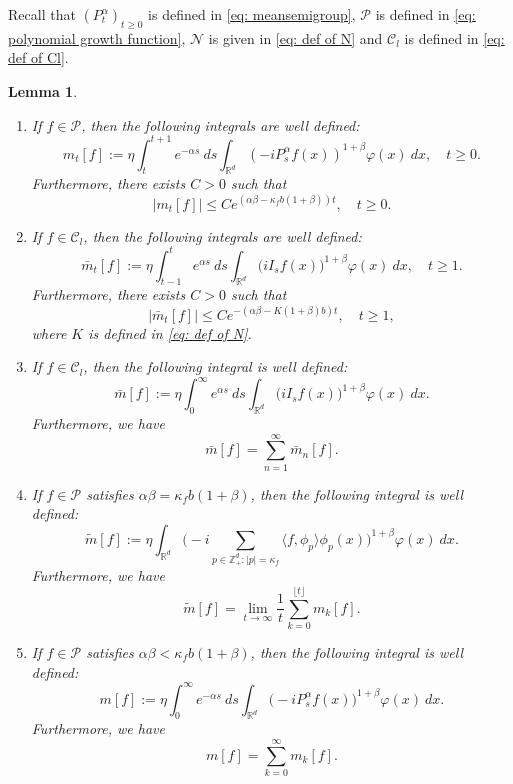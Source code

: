 \documentclass[12pt,a4paper]{amsart}
\theoremstyle{plain}
\newtheorem{lem}[thm]{Lemma}
\theoremstyle{definition}
\numberwithin{equation}{section}
\begin{document}
Recall that $(P^\alpha_t)_{t\geq 0}$ is defined in \eqref{eq: meansemigroup}, $\mathcal P$ is defined in \eqref{eq: polynomial growth function}, $\mathcal N$ is given in \eqref{eq: def of N} and $\mathcal C_l$ is defined in \eqref{eq: def of Cl}.
\begin{lem}
\label{lem: def of all m}
\begin{enumerate}
\item
  If $f\in\mathcal{P}$, then the following integrals are well defined:
  \[
    m_t[f]
    := \eta \int_t^{t+1}e^{-\alpha s}~ds\int_{\mathbb R^d} (-iP_{s}^\alpha f(x))^{1+\beta} \varphi(x)~dx,
    \quad t\geq 0.
  \]
	Furthermore, there exists  $C>0$ such that
  \begin{equation}
    \label{domi-m}
    |m_t[f]|
    \leq C e^{(\alpha\beta-\kappa_fb(1+\beta))t},
    \quad t\geq 0.
  \end{equation}
\item
  If $f\in\mathcal C_l$, then the following integrals are well defined:
  \[
    \bar{m}_t[f]
    := \eta \int_{t-1}^{t} e^{\alpha s}~ds \int_{\mathbb R^d}\big(iI_sf(x)\big)^{1+\beta} \varphi(x)~dx, \quad t\geq 1.
  \]
  Furthermore, there exists  $C>0$ such that
  \begin{equation}
    |\bar{m}_t[f]| 
    \leq C e^{-(\alpha\beta-K(1+\beta)b)t}, \quad t\geq 1,
  \end{equation}
  where $K$ is defined in \eqref{eq: def of N}.
\item
  If $f \in \mathcal C_l$, then the following integral is well defined:
  \[
    \bar{m}[f]
    :=\eta \int_{0}^{\infty} e^{\alpha s}~ds \int_{\mathbb R^d} \big( iI_sf(x) \big)^{ 1 + \beta } \varphi( x ) ~dx.
  \]
  Furthermore, we have
  \begin{equation}
    \label{sum-bar-m}
    \bar{m}[f]
    = \sum_{n=1}^{\infty} \bar{m}_n[f].
  \end{equation}
\item
  If $f \in \mathcal{P}$ satisfies $\alpha\beta=\kappa_f b(1+\beta)$, then the following integral is well defined:
  \[
    \widetilde{m}[f]
    := \eta\int_{\mathbb R^d} \Big(-i\sum_{p\in \mathbb Z_+^d:|p|=\kappa_f}\langle f,\phi_p\rangle\phi_p(x)\Big)^{1+\beta} \varphi(x)~dx.
  \]
	Furthermore, we have
  \begin{equation}
    \label{para: critical case}
    \widetilde{m}[f] 
    = \lim_{t\rightarrow \infty}\frac{1}{t}\sum_{k=0}^{\lfloor t \rfloor}m_k[f].
  \end{equation}
\item
  If $f\in \mathcal{P}$ satisfies $\alpha\beta<\kappa_fb(1+\beta)$, then the following integral is well defined:
  \[
    m[f]
    := \eta \int_0^{\infty} e^{-\alpha s} ~ds\int_{\mathbb R^d} \big(-iP_s^\alpha f(x)\big)^{1+\beta} \varphi(x)~dx.
  \]
	Furthermore, we have
  \begin{equation}
    \label{sum-m}
    m[f]
    = \sum_{k=0}^\infty m_k[f].
  \end{equation}
\end{enumerate}
\end{lem}
\end{document}
